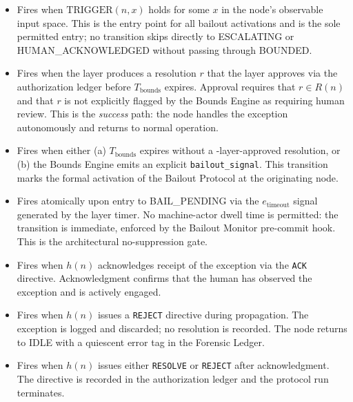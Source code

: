 \begin{itemize}\itemsep=0pt
\item[T1 --- \texttt{IDLE $\rightarrow$ BOUNDED}:] Fires when $\text{TRIGGER}(n, x)$ holds for some $x$ in the node's observable input space. This is the entry point for all bailout activations and is the sole permitted entry; no transition skips directly to ESCALATING or HUMAN\_ACKNOWLEDGED without passing through BOUNDED.

\item[T2 --- \texttt{BOUNDED $\rightarrow$ HUMAN\_ACKNOWLEDGED}:] Fires when the \bounds{} layer produces a resolution $r$ that the \fact{} layer approves via the authorization ledger before $T_{\text{bounds}}$ expires. Approval requires that $r \in R(n)$ and that $r$ is not explicitly flagged by the Bounds Engine as requiring human review. This is the \emph{success} path: the node handles the exception autonomously and returns to normal operation.

\item[T3 --- \texttt{BOUNDED $\rightarrow$ BAIL\_PENDING}:] Fires when either (a) $T_{\text{bounds}}$ expires without a \fact-layer-approved resolution, or (b) the Bounds Engine emits an explicit \texttt{bailout\_signal}. This transition marks the formal activation of the Bailout Protocol at the originating node.

\item[T4 --- \texttt{BAIL\_PENDING $\rightarrow$ ESCALATING}:] Fires atomically upon entry to BAIL\_PENDING via the $e_{\text{timeout}}$ signal generated by the \fact{} layer timer. No machine-actor dwell time is permitted: the transition is immediate, enforced by the Bailout Monitor pre-commit hook. This is the architectural no-suppression gate.

\item[T5 --- \texttt{ESCALATING $\rightarrow$ HUMAN\_ACKNOWLEDGED}:] Fires when $h(n)$ acknowledges receipt of the exception via the \texttt{ACK} directive. Acknowledgment confirms that the human has observed the exception and is actively engaged.

\item[T6 --- \texttt{ESCALATING $\rightarrow$ IDLE}:] Fires when $h(n)$ issues a \texttt{REJECT} directive during propagation. The exception is logged and discarded; no resolution is recorded. The node returns to IDLE with a quiescent error tag in the Forensic Ledger.

\item[T7 --- \texttt{ESCALATING $\rightarrow$ RESOLVED}:] Fires when $h(n)$ issues either \texttt{RESOLVE} or \texttt{REJECT} after acknowledgment. The directive is recorded in the authorization ledger and the protocol run terminates.


\end{itemize}

